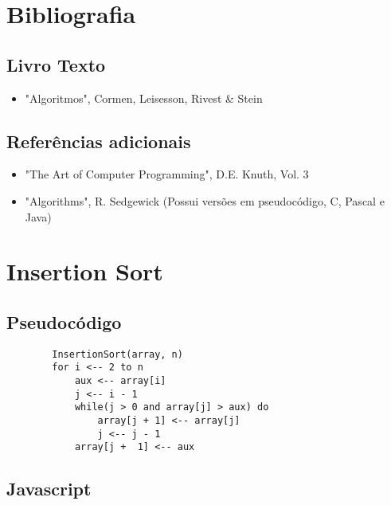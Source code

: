 \documentclass{article}
\begin{document}
    
    
    \section{Bibliografia}
    
    
    \subsection{Livro Texto}
    
    
    \begin{itemize}
    \item \textnormal{"Algoritmos", Cormen, Leisesson, Rivest & Stein}
    \end{itemize}
    
    \subsection{Referências adicionais}
    
    \begin{itemize}
    \item \textnormal{"The Art of Computer Programming", D.E. Knuth, Vol. 3}
    \item \textnormal{"Algorithms", R. Sedgewick (Possui versões em pseudocódigo, C, Pascal e Java)}
    \end{itemize}
    
    
    
    
    
    \section{Insertion Sort}
    
    \subsection{Pseudocódigo}
    \begin{lstlisting}
        InsertionSort(array, n)
        for i <-- 2 to n
            aux <-- array[i]
            j <-- i - 1
            while(j > 0 and array[j] > aux) do
                array[j + 1] <-- array[j]
                j <-- j - 1
            array[j +  1] <-- aux
    \end{lstlisting}
    
    \subsection{Javascript}
    
\end{document}
